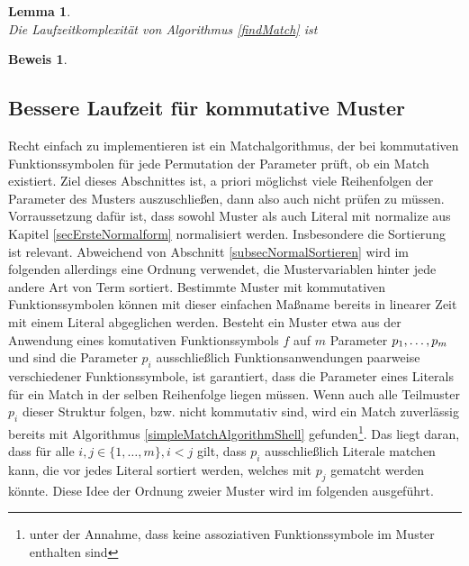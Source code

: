 \newtheorem{lemKomplexitaetKomm}[bsp]{Lemma}
\begin{lemKomplexitaetKomm}\label{lemKomplexitaetKomm}~\\
Die Laufzeitkomplexität von Algorithmus \ref{findMatch} ist 
\end{lemKomplexitaetKomm}

\newtheorem{bewKomplexitaetKomm}[bsp]{Beweis}
\begin{bewKomplexitaetKomm}~\\
\end{bewKomplexitaetKomm}

\subsection{Bessere Laufzeit für kommutative Muster} \label{subsecCMuster}

Recht einfach zu implementieren ist ein Matchalgorithmus, der bei kommutativen Funktionssymbolen für jede Permutation der Parameter prüft, ob ein Match existiert. Ziel dieses Abschnittes ist, a priori möglichst viele Reihenfolgen der Parameter des Musters auszuschließen, dann also auch nicht prüfen zu müssen. Vorraussetzung dafür ist, dass sowohl Muster als auch Literal mit $\mathrm{normalize}$ aus Kapitel \ref{secErsteNormalform} normalisiert werden. Insbesondere die Sortierung ist relevant. Abweichend von Abschnitt \ref{subsecNormalSortieren} wird im folgenden allerdings eine Ordnung verwendet, die Mustervariablen hinter jede andere Art von Term sortiert.
Bestimmte Muster mit kommutativen Funktionssymbolen können mit dieser einfachen Maßname bereits in linearer Zeit mit einem Literal abgeglichen werden. Besteht ein Muster etwa aus der Anwendung eines komutativen Funktionssymbols $f$ auf $m$ Parameter ${p}_{1}, \dots, {p}_{m}$ und sind die Parameter $p_i$ ausschließlich Funktionsanwendungen paarweise verschiedener Funktionssymbole, ist garantiert, dass die Parameter eines Literals für ein Match in der selben Reihenfolge liegen müssen. Wenn auch alle Teilmuster $p_i$ dieser Struktur folgen, bzw. nicht kommutativ sind, wird ein Match zuverlässig bereits mit Algorithmus \ref{simpleMatchAlgorithmShell} gefunden\footnote{unter der Annahme, dass keine assoziativen Funktionssymbole im Muster enthalten sind}. Das liegt daran, dass für alle $i, j \in \{1, \dots, m\}, i < j$ gilt, dass $p_i$ ausschließlich Literale matchen kann, die vor jedes Literal sortiert werden, welches mit $p_j$ gematcht werden könnte. Diese Idee der Ordnung zweier Muster wird im folgenden ausgeführt.


